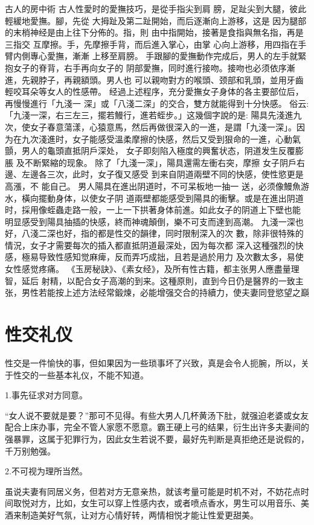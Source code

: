 \documentclass[12pt,UTF8]{ctexbook}
\begin{document}
古人的房中術
古人性愛时的愛撫技巧，是從手指尖到肩
膀，足趾尖到大腿，彼此輕緩地愛撫。腳，先從
大拇趾及第二趾開始，而后逐漸向上游移，这是
因为腿部的末梢神经是由上往下分佈的。指，則
由中指開始，接著是食指與無名指，再是三指交
互摩擦。手，先摩擦手背，而后進入掌心，由掌
心向上游移，用四指在手臂内側專心愛撫，漸漸
上移至肩膀。
手跟腳的愛撫動作完成后，男人的左手就緊抱女子的脊背，右手再向女子的
阴部愛撫，同时進行接吻。接吻也必须依序漸進，先親脖子，再親額頭。男人也
可以親吻對方的喉頭、颈部和乳頭，並用牙齒輕咬耳朵等女人的性感帶。
经過上述程序，充分愛撫女子身体的各主要部位后，再慢慢進行「九淺一
深」或「八淺二深」的交合，雙方就能得到十分快感。
俗云:「九淺一深，右三左三，擺若鰻行，進若蛭步。」这幾個字說的是:
陽具先淺進九次，使女子春意蕩漾，心猿意馬，然后再做很深入的一進，是謂「九淺一深」。因为在九次淺進时，女子能感受溫柔摩擦的快感，然后又受到狠命的一進，心動氣顫，男人的龜頭直抵阴戶深处，
女子即刻陷入極度的興奮状态，阴道发生反覆膨脹
及不断緊縮的现象。
除了「九淺一深」，陽具還需左衝右突，摩擦
女子阴戶右邊、左邊各三次，此时，女子復又感受
到来自阴道兩壁不同的快感，使性慾更是高漲，不
能自己。
男人陽具在進出阴道时，不可呆板地一抽一
送，必须像鰻魚游水，橫向擺動身体，以使女子阴
道兩壁都能感受到陽具的衝擊。或是在進出阴道
时，採用像蛭蟲走路一般，一上一下拱著身体前進。如此女子的阴道上下壁也能
明显感受到陽具抽插的快感，終而神魂顛倒，樂不可支而達到高潮。
九淺一深也好，八淺二深也好，指的都是性交的韻律，同时限制深入的次
數，除非很特殊的情況，女子才需要每次的插入都直抵阴道最深处，因为每次都
深入这種强烈的快感，極易导致性感知觉麻痺，反而弄巧成拙，且若是過於用力
及次數太多，易使女性感觉疼痛。
《玉房秘訣》、《素女经》，及所有性古籍，都主张男人應盡量理智，延后
射精，以配合女子高潮的到来。这種原則，直到今日仍是醫界的一致主张，男性若能按上述方法经常鍛煉，必能增强交合的持續力，使夫妻同登慾望之巔

\chapter{性交礼仪}

性交是一件愉快的事，但如果因为一些琐事坏了兴致，真是会令人扼腕，所以，关于性交的一些基本礼仪，不能不知道。

1.事先征求对方同意。

“女人说不要就是要？”那可不见得。有些大男人几杯黄汤下肚，就强迫老婆或女友配合上床办事，完全不管人家愿不愿意。霸王硬上弓的结果，衍生出许多夫妻间的强暴罪，这属于犯罪行为，因此女生若说不要，最好先判断是真拒绝还是说假的，千万别勉强。

2.不可视为理所当然。

虽说夫妻有同居义务，但若对方无意亲热，就该考量可能是时机不对，不妨花点时间取悦对方，比如，女生可以穿上性感内衣，或者喷点香水，男生可以用音乐、美酒来制造美好气氛，让对方心情好转，两情相悦才能让性爱更甜美。
\end{document}
